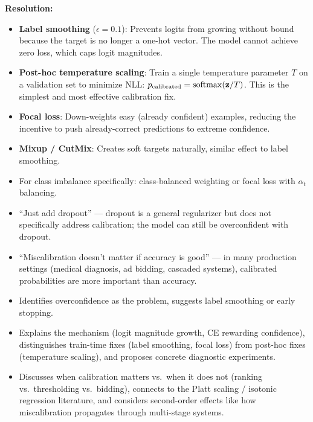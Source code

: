 \begin{interviewq}
\textbf{Resolution:}
\begin{itemize}
    \item \textbf{Label smoothing} ($\epsilon = 0.1$): Prevents logits from growing without bound because the target is no longer a one-hot vector. The model cannot achieve zero loss, which caps logit magnitudes.
    \item \textbf{Post-hoc temperature scaling}: Train a single temperature parameter $T$ on a validation set to minimize NLL: $p_{\text{calibrated}} = \operatorname{softmax}(\mathbf{z} / T)$. This is the simplest and most effective calibration fix.
    \item \textbf{Focal loss}: Down-weights easy (already confident) examples, reducing the incentive to push already-correct predictions to extreme confidence.
    \item \textbf{Mixup / CutMix}: Creates soft targets naturally, similar effect to label smoothing.
    \item For class imbalance specifically: class-balanced weighting or focal loss with $\alpha_t$ balancing.
\end{itemize}

\redflags
\begin{itemize}
    \item ``Just add dropout'' --- dropout is a general regularizer but does not specifically address calibration; the model can still be overconfident with dropout.
    \item ``Miscalibration doesn't matter if accuracy is good'' --- in many production settings (medical diagnosis, ad bidding, cascaded systems), calibrated probabilities are more important than accuracy.
\end{itemize}


\goodgreat
\begin{itemize}
    \item {} Identifies overconfidence as the problem, suggests label smoothing or early stopping.
    \item {} Explains the mechanism (logit magnitude growth, CE rewarding confidence), distinguishes train-time fixes (label smoothing, focal loss) from post-hoc fixes (temperature scaling), and proposes concrete diagnostic experiments.
    \item {} Discusses when calibration matters vs.\ when it does not (ranking vs.\ thresholding vs.\ bidding), connects to the Platt scaling / isotonic regression literature, and considers second-order effects like how miscalibration propagates through multi-stage systems.
\end{itemize}

\end{interviewq}

